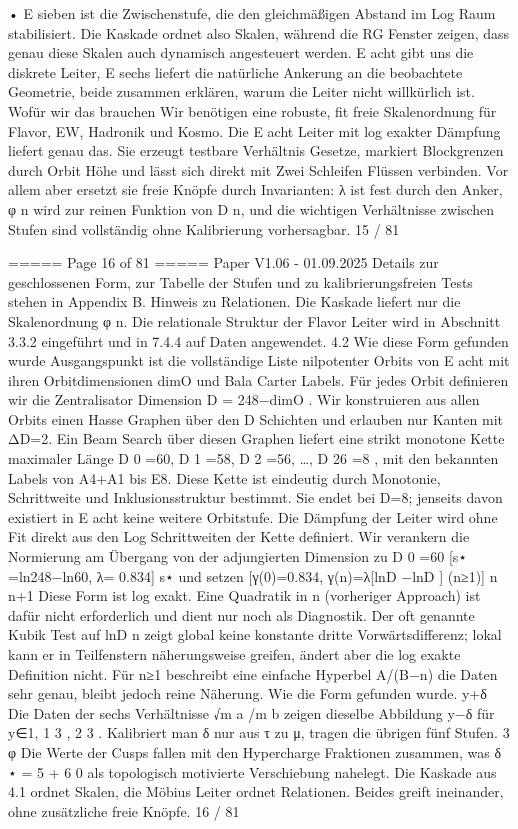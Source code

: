 \begin{MyVerbatim}
• E sieben ist die Zwischenstufe, die den gleichmäßigen Abstand im Log Raum stabilisiert.
Die Kaskade ordnet also Skalen, während die RG Fenster zeigen, dass genau diese Skalen auch dynamisch
angesteuert werden. E acht gibt uns die diskrete Leiter, E sechs liefert die natürliche Ankerung an die beobachtete
Geometrie, beide zusammen erklären, warum die Leiter nicht willkürlich ist.
Wofür wir das brauchen
Wir benötigen eine robuste, fit freie Skalenordnung für Flavor, EW, Hadronik und Kosmo. Die E acht Leiter mit log
exakter Dämpfung liefert genau das. Sie erzeugt testbare Verhältnis Gesetze, markiert Blockgrenzen durch Orbit Höhe
und lässt sich direkt mit Zwei Schleifen Flüssen verbinden. Vor allem aber ersetzt sie freie Knöpfe durch Invarianten: λ
ist fest durch den Anker, φ n wird zur reinen Funktion von D n, und die wichtigen Verhältnisse zwischen Stufen sind
vollständig ohne Kalibrierung vorhersagbar.
15 / 81

===== Page 16 of 81 =====
Paper V1.06 - 01.09.2025
Details zur geschlossenen Form, zur Tabelle der Stufen und zu kalibrierungsfreien Tests stehen in Appendix B.
Hinweis zu Relationen.
Die Kaskade liefert nur die Skalenordnung φ n.
Die relationale Struktur der Flavor Leiter wird in Abschnitt 3.3.2 eingeführt und in 7.4.4 auf Daten angewendet.
4.2 Wie diese Form gefunden wurde
Ausgangspunkt ist die vollständige Liste nilpotenter Orbits von E acht mit ihren Orbitdimensionen dimO und Bala Carter
Labels. Für jedes Orbit definieren wir die Zentralisator Dimension
D = 248−dimO .
Wir konstruieren aus allen Orbits einen Hasse Graphen über den D Schichten und erlauben nur Kanten mit ΔD=2. Ein
Beam Search über diesen Graphen liefert eine strikt monotone Kette maximaler Länge
D 0 =60, D 1 =58, D 2 =56, …, D 26 =8 ,
mit den bekannten Labels von A4+A1 bis E8. Diese Kette ist eindeutig durch Monotonie, Schrittweite und
Inklusionsstruktur bestimmt. Sie endet bei D=8; jenseits davon existiert in E acht keine weitere Orbitstufe.
Die Dämpfung der Leiter wird ohne Fit direkt aus den Log Schrittweiten der Kette definiert.
Wir verankern die Normierung am Übergang von der adjungierten Dimension zu D 0 =60
[s⋆ =ln248−ln60, λ= 0.834]
s⋆
und setzen
[γ(0)=0.834, γ(n)=λ[lnD −lnD ] (n≥1)]
n n+1
Diese Form ist log exakt. Eine Quadratik in n (vorheriger Approach) ist dafür nicht erforderlich und dient nur noch als
Diagnostik. Der oft genannte Kubik Test auf lnD n zeigt global keine konstante dritte Vorwärtsdifferenz; lokal kann er in
Teilfenstern näherungsweise greifen, ändert aber die log exakte Definition nicht. Für n≥1 beschreibt eine einfache
Hyperbel A/(B−n) die Daten sehr genau, bleibt jedoch reine Näherung.
Wie die Form gefunden wurde.
y+δ
Die Daten der sechs Verhältnisse √m a /m b zeigen dieselbe Abbildung y−δ für y∈{1, 1 3 , 2 3 }.
Kalibriert man δ nur aus τ zu μ, tragen die übrigen fünf Stufen.
3 φ
Die Werte der Cusps fallen mit den Hypercharge Fraktionen zusammen, was δ ⋆ = 5 + 6 0 als topologisch motivierte
Verschiebung nahelegt.
Die Kaskade aus 4.1 ordnet Skalen, die Möbius Leiter ordnet Relationen. Beides greift ineinander, ohne zusätzliche freie
Knöpfe.
16 / 81


\end{MyVerbatim}
